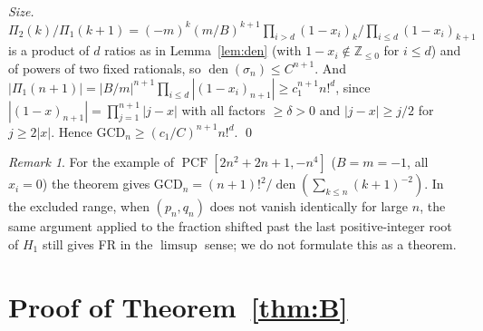 \documentclass[11pt]{amsart}
\theoremstyle{definition}
\theoremstyle{remark}
\newtheorem{remark}[lemma]{Remark}
\numberwithin{equation}{section}
\newcommand{\PCF}{\operatorname{PCF}}
\newcommand{\Z}{\mathbb{Z}}
\newcommand{\GCD}{\mathrm{GCD}}
\newcommand{\den}{\operatorname{den}}
\begin{document}
\emph{Size.} $\Pi_2(k)/\Pi_1(k+1)=(-m)^k(m/B)^{k+1}\prod_{i>d}(1-x_i)_k/\prod_{i\le d}(1-x_i)_{k+1}$ is a product of $d$ ratios as in Lemma~\ref{lem:den} (with $1-x_i\notin\Z_{\le0}$ for $i\le d$) and of powers of two fixed rationals, so $\den(\sigma_n)\le C^{n+1}$. And $|\Pi_1(n+1)|=|B/m|^{n+1}\prod_{i\le d}|(1-x_i)_{n+1}|\ge c_1^{n+1}n!^d$, since $|(1-x)_{n+1}|=\prod_{j=1}^{n+1}|j-x|$ with all factors $\ge\delta>0$ and $|j-x|\ge j/2$ for $j\ge2|x|$. Hence $\GCD_n\ge(c_1/C)^{n+1}n!^d$. \qed

\begin{remark}
For the example of \cite{BDNM} $\PCF[2n^2+2n+1,-n^4]$ ($B=m=-1$, all $x_i=0$) the theorem gives $\GCD_n=(n+1)!^2/\den(\sum_{k\le n}(k+1)^{-2})$. In the excluded range, when $(p_n,q_n)$ does not vanish identically for large $n$, the same argument applied to the fraction shifted past the last positive-integer root of $H_1$ still gives FR in the $\limsup$ sense; we do not formulate this as a theorem.
\end{remark}

\section{Proof of Theorem~\ref{thm:B}}
\end{document}
